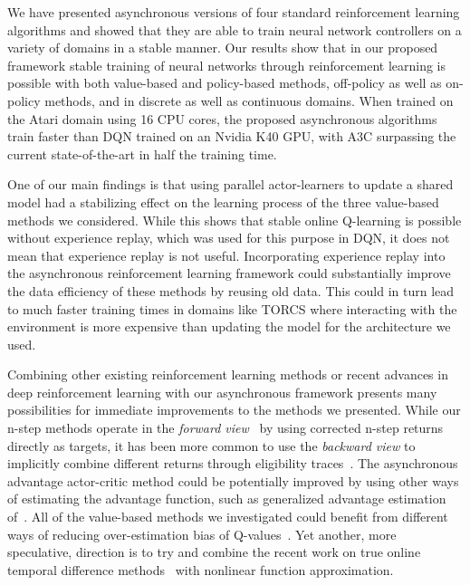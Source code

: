 \documentclass{article} %
\begin{document}
We have presented asynchronous versions of four standard reinforcement learning algorithms and showed that they are able to train neural network controllers on a variety of domains in a stable manner.
Our results show that in our proposed framework stable training of neural networks through reinforcement learning is possible with both value-based and policy-based methods, off-policy as well as on-policy methods, and in discrete as well as continuous domains.
When trained on the Atari domain using 16 CPU cores, the proposed asynchronous algorithms train faster than DQN trained on an Nvidia K40 GPU, with A3C surpassing the current state-of-the-art in half the training time.
%

One of our main findings is that using parallel actor-learners to update a shared model had a stabilizing effect on the learning process of the three value-based methods we considered.
While this shows that stable online Q-learning is possible without experience replay, which was used for this purpose in DQN, it does not mean that experience replay is not useful.
Incorporating experience replay into the asynchronous reinforcement learning framework could substantially improve the data efficiency of these methods by reusing old data.
This could in turn lead to much faster training times in domains like TORCS where interacting with the environment is more expensive than updating the model for the architecture we used.

Combining other existing reinforcement learning methods or recent advances in deep reinforcement learning with our asynchronous framework presents many possibilities for immediate improvements to the methods we presented.
While our n-step methods operate in the \emph{forward view}~\citep{sutton:book} by using corrected n-step returns directly as targets, it has been more common to use the \emph{backward view} to implicitly combine different returns through eligibility traces~\citep{watkins1989learning,sutton:book,peng1996msq}.
The asynchronous advantage actor-critic method could be potentially improved by using other ways of estimating the advantage function, such as generalized advantage estimation of~\cite{schulman2015gae}.
%
All of the value-based methods we investigated could benefit from different ways of reducing over-estimation bias of Q-values~\citep{hado2015doubledqn,bellemare2016gap}.
Yet another, more speculative, direction is to try and combine the recent work on true online temporal difference methods~\citep{seijen2015true} with nonlinear function approximation.
\end{document}
